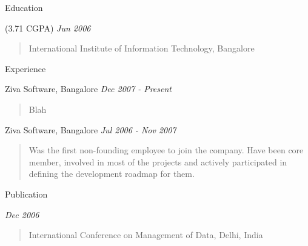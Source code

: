 \documentclass{resume}
\author{Siddhartha Reddy Kothakapu}
\newcommand{\period}{\hfill\small\sl}
\begin{document}
\maketitle

\begin{category}{Education}

     {\footnotesize(3.71 CGPA)} {\period Jun 2006}
    \begin{quote}
        International Institute of Information Technology, Bangalore
    \end{quote}

\end{category}


\begin{category}{Experience}

     Ziva Software, Bangalore {\period Dec 2007 - Present}
    \begin{quote}
        Blah
    \end{quote}

     Ziva Software, Bangalore {\period Jul 2006 - Nov 2007}
    \begin{quote}
        Was the first non-founding employee to join the company. Have been core member, involved in most of the projects and actively participated in defining the development roadmap for them.
    \end{quote}

\end{category}


\begin{category}{Publication}

     {\period Dec 2006}
    \begin{quote}
        International Conference on Management of Data, Delhi, India
    \end{quote}

\end{category}
\end{document}
